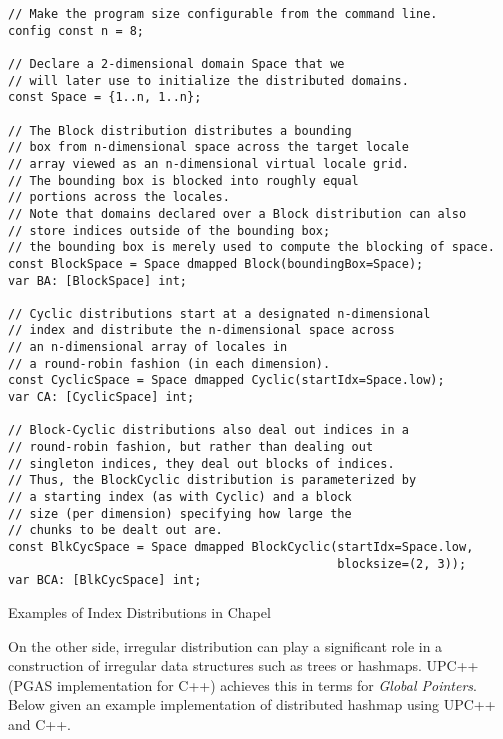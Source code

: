 \documentclass[14pt]{extreport}
\begin{document}
\begin{listing}[H]
\begin{verbatim}
// Make the program size configurable from the command line.
config const n = 8;

// Declare a 2-dimensional domain Space that we 
// will later use to initialize the distributed domains.
const Space = {1..n, 1..n};

// The Block distribution distributes a bounding 
// box from n-dimensional space across the target locale 
// array viewed as an n-dimensional virtual locale grid. 
// The bounding box is blocked into roughly equal 
// portions across the locales. 
// Note that domains declared over a Block distribution can also 
// store indices outside of the bounding box;
// the bounding box is merely used to compute the blocking of space.
const BlockSpace = Space dmapped Block(boundingBox=Space);
var BA: [BlockSpace] int;

// Cyclic distributions start at a designated n-dimensional 
// index and distribute the n-dimensional space across 
// an n-dimensional array of locales in 
// a round-robin fashion (in each dimension).
const CyclicSpace = Space dmapped Cyclic(startIdx=Space.low);
var CA: [CyclicSpace] int;

// Block-Cyclic distributions also deal out indices in a 
// round-robin fashion, but rather than dealing out 
// singleton indices, they deal out blocks of indices. 
// Thus, the BlockCyclic distribution is parameterized by 
// a starting index (as with Cyclic) and a block 
// size (per dimension) specifying how large the 
// chunks to be dealt out are.
const BlkCycSpace = Space dmapped BlockCyclic(startIdx=Space.low,
                                              blocksize=(2, 3));
var BCA: [BlkCycSpace] int;
\end{verbatim}
\caption{Examples of Index Distributions in Chapel}
\end{listing}

On the other side, irregular distribution can play a significant role in a construction of irregular data structures such as trees or hashmaps. UPC++(PGAS implementation for C++) achieves this in terms for \textit{Global Pointers}. Below given an example implementation of distributed hashmap using UPC++ and C++.
\end{document}

